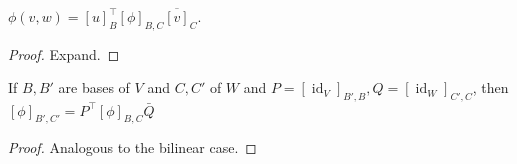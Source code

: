 \begin{lemma}
    $\phi(v,w)=[u]_B^\top [\phi]_{B,C}\overline{[v]}_C$.
\end{lemma}
\begin{proof}
    Expand.
\end{proof}
\begin{lemma}
    If $B,B'$ are bases of $V$ and $C,C'$ of $W$ and $P=[\operatorname{id}_V]_{B',B},Q=[\operatorname{id}_W]_{C',C}$, then $[\phi]_{B',C'}=P^\top[\phi]_{B,C}\bar{Q}$
\end{lemma}
\begin{proof}
    Analogous to the bilinear case.
\end{proof}